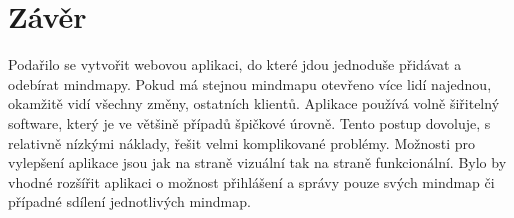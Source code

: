 
\chapter[Závěr]{Závěr}

Podařilo se vytvořit webovou aplikaci, do které jdou jednoduše přidávat a odebírat mindmapy. Pokud má stejnou mindmapu otevřeno více lidí najednou, okamžitě vidí všechny změny, ostatních klientů. Aplikace používá volně šiřitelný software, který je ve většině případů špičkové úrovně. Tento 
postup dovoluje, s relativně nízkými náklady, řešit velmi komplikované problémy. Možnosti pro vylepšení aplikace jsou jak na straně vizuální tak na straně funkcionální. Bylo by vhodné rozšířit aplikaci o možnost přihlášení a správy pouze svých mindmap či případné sdílení jednotlivých mindmap.